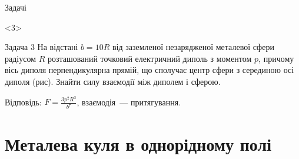 \documentclass[onlytextwidth]{beamer}
\begin{document}
\begin{frame}{Задачі}{}
\begin{onlyenv}
	\end{onlyenv}

	\begin{onlyenv}
		\begin{exampleblock}{Задача 3}\justifying
			На відстані $b= 10R$ від заземленої незарядженої металевої сфери радіусом $R$ розташований
			точковий електричний диполь з моментом $p$, причому вісь диполя перпендикулярна прямій, що
			сполучає центр сфери з серединою осі диполя (рис). Знайти силу взаємодії між
			диполем і сферою.

			\medskip

			Відповідь: $F = \frac{3p^2R^3}{b^7}$, взаємодія~--- притягування.

			\begin{figure}[h!]\centering
				\label{Ovch2.32}
			\end{figure}
		\end{exampleblock}

	\end{onlyenv}

\end{frame}



\section{Металева куля в однорідному полі}
\end{document}
